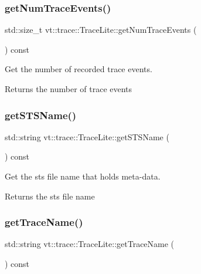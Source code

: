 \subsubsection{\texorpdfstring{get\+Num\+Trace\+Events()}{getNumTraceEvents()}}
{\footnotesize\ttfamily std\+::size\+\_\+t vt\+::trace\+::\+Trace\+Lite\+::get\+Num\+Trace\+Events (\begin{DoxyParamCaption}{ }\end{DoxyParamCaption}) const\hspace{0.3cm}{\ttfamily [inline]}}



Get the number of recorded trace events. 

\begin{DoxyReturn}{Returns}
the number of trace events 
\end{DoxyReturn}
\mbox{\label{structvt_1_1trace_1_1_trace_lite_af62ce95a0cd54b4d729e730e9dd94311}} 
\subsubsection{\texorpdfstring{get\+S\+T\+S\+Name()}{getSTSName()}}
{\footnotesize\ttfamily std\+::string vt\+::trace\+::\+Trace\+Lite\+::get\+S\+T\+S\+Name (\begin{DoxyParamCaption}{ }\end{DoxyParamCaption}) const\hspace{0.3cm}{\ttfamily [inline]}}



Get the sts file name that holds meta-\/data. 

\begin{DoxyReturn}{Returns}
the sts file name 
\end{DoxyReturn}
\mbox{\label{structvt_1_1trace_1_1_trace_lite_aa0cff75782c7c6fb3f90731b98b49c2f}} 
\subsubsection{\texorpdfstring{get\+Trace\+Name()}{getTraceName()}}
{\footnotesize\ttfamily std\+::string vt\+::trace\+::\+Trace\+Lite\+::get\+Trace\+Name (\begin{DoxyParamCaption}{ }\end{DoxyParamCaption}) const\hspace{0.3cm}{\ttfamily [inline]}}



